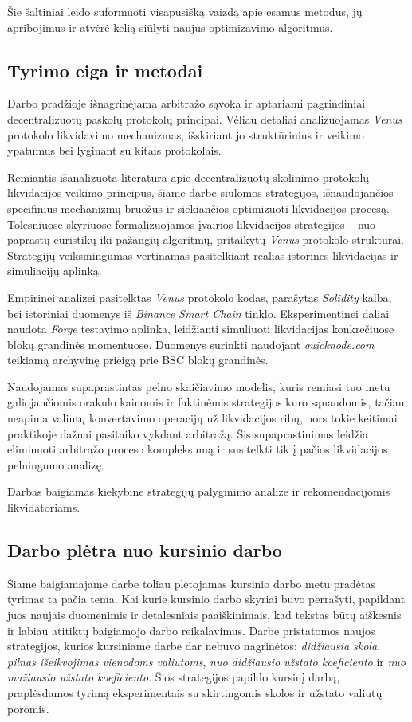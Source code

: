 \documentclass[]{VUMIFTemplateClass}
\begin{document}
Šie šaltiniai leido suformuoti visapusišką vaizdą apie esamus metodus, jų apribojimus ir atvėrė kelią siūlyti naujus optimizavimo algoritmus.

\subsection*{Tyrimo eiga ir metodai}
Darbo pradžioje išnagrinėjama arbitražo sąvoka ir aptariami pagrindiniai decentralizuotų paskolų protokolų principai. Vėliau detaliai analizuojamas \textit{Venus} protokolo likvidavimo mechanizmas, išskiriant jo struktūrinius ir veikimo ypatumus bei lyginant su kitais protokolais.

Remiantis išanalizuota literatūra apie decentralizuotų skolinimo protokolų likvidacijos veikimo principus, šiame darbe siūlomos strategijos, išnaudojančios specifinius mechanizmų bruožus ir siekiančios optimizuoti likvidacijos procesą. Tolesniuose skyriuose formalizuojamos įvairios likvidacijos strategijos – nuo paprastų euristikų iki pažangių algoritmų, pritaikytų \textit{Venus} protokolo struktūrai. Strategijų veiksmingumas vertinamas pasitelkiant realias istorines likvidacijas ir simuliacijų aplinką.

Empirinei analizei pasitelktas \textit{Venus} protokolo kodas, parašytas \textit{Solidity} kalba, bei istoriniai duomenys iš \textit{Binance Smart Chain} tinklo. Eksperimentinei daliai naudota \textit{Forge} \cite{forge} testavimo aplinka, leidžianti simuliuoti likvidacijas konkrečiuose blokų grandinės momentuose. Duomenys surinkti naudojant \textit{quicknode.com} teikiamą archyvinę prieigą prie BSC blokų grandinės.

Naudojamas supaprastintas pelno skaičiavimo modelis, kuris remiasi tuo metu galiojančiomis orakulo kainomis ir faktinėmis strategijos kuro sąnaudomis, tačiau neapima valiutų konvertavimo operacijų už likvidacijos ribų, nors tokie keitimai praktikoje dažnai pasitaiko vykdant arbitražą. Šis supaprastinimas leidžia eliminuoti arbitražo proceso kompleksumą ir susitelkti tik į pačios likvidacijos pelningumo analizę.

Darbas baigiamas kiekybine strategijų palyginimo analize ir rekomendacijomis likvidatoriams.

\subsection*{Darbo plėtra nuo kursinio darbo}
Šiame baigiamajame darbe toliau plėtojamas kursinio darbo metu pradėtas tyrimas ta pačia tema. Kai kurie kursinio darbo skyriai buvo perrašyti, papildant juos naujais duomenimis ir detalesniais paaiškinimais, kad tekstas būtų aiškesnis ir labiau atitiktų baigiamojo darbo reikalavimus. Darbe pristatomos naujos strategijos, kurios kursiniame darbe dar nebuvo nagrinėtos: \textit{didžiausia skola}, \textit{pilnas išeikvojimas vienodoms valiutoms}, \textit{nuo didžiausio užstato koeficiento} ir \textit{nuo mažiausio užstato koeficiento}. Šios strategijos papildo kursinį darbą, praplėsdamos tyrimą eksperimentais su skirtingomis skolos ir užstato valiutų poromis.
\end{document}
